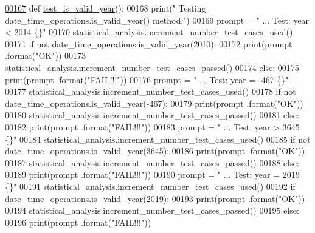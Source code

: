 \begin{DoxyCode}
\hypertarget{classutilities_1_1date__time__processing__tester_1_1date__time__operations__tester_l00167}{}\hyperlink{classutilities_1_1date__time__processing__tester_1_1date__time__operations__tester_ae745c61827bc1d30d5c964b4d9586343}{00167}     \textcolor{keyword}{def }\hyperlink{classutilities_1_1date__time__processing__tester_1_1date__time__operations__tester_ae745c61827bc1d30d5c964b4d9586343}{test\_is\_valid\_year}():
00168         print(\textcolor{stringliteral}{" Testing date\_time\_operations.is\_valid\_year() method."})
00169         prompt = \textcolor{stringliteral}{"  ... Test: year < 2014                   \{\}"}
00170         statistical\_analysis.increment\_number\_test\_cases\_used()
00171         \textcolor{keywordflow}{if} \textcolor{keywordflow}{not} date\_time\_operations.is\_valid\_year(2010):
00172             print(prompt .format(\textcolor{stringliteral}{"OK"}))
00173             statistical\_analysis.increment\_number\_test\_cases\_passed()
00174         \textcolor{keywordflow}{else}:
00175             print(prompt .format(\textcolor{stringliteral}{"FAIL!!!"}))
00176         prompt = \textcolor{stringliteral}{"  ... Test: year = -467                   \{\}"}
00177         statistical\_analysis.increment\_number\_test\_cases\_used()
00178         \textcolor{keywordflow}{if} \textcolor{keywordflow}{not} date\_time\_operations.is\_valid\_year(-467):
00179             print(prompt .format(\textcolor{stringliteral}{"OK"}))
00180             statistical\_analysis.increment\_number\_test\_cases\_passed()
00181         \textcolor{keywordflow}{else}:
00182             print(prompt .format(\textcolor{stringliteral}{"FAIL!!!"}))
00183         prompt = \textcolor{stringliteral}{"  ... Test: year > 3645                   \{\}"}
00184         statistical\_analysis.increment\_number\_test\_cases\_used()
00185         \textcolor{keywordflow}{if} \textcolor{keywordflow}{not} date\_time\_operations.is\_valid\_year(3645):
00186             print(prompt .format(\textcolor{stringliteral}{"OK"}))
00187             statistical\_analysis.increment\_number\_test\_cases\_passed()
00188         \textcolor{keywordflow}{else}:
00189             print(prompt .format(\textcolor{stringliteral}{"FAIL!!!"}))
00190         prompt = \textcolor{stringliteral}{"  ... Test: year = 2019                   \{\}"}
00191         statistical\_analysis.increment\_number\_test\_cases\_used()
00192         \textcolor{keywordflow}{if} date\_time\_operations.is\_valid\_year(2019):
00193             print(prompt .format(\textcolor{stringliteral}{"OK"}))
00194             statistical\_analysis.increment\_number\_test\_cases\_passed()
00195         \textcolor{keywordflow}{else}:
00196             print(prompt .format(\textcolor{stringliteral}{"FAIL!!!"}))
\end{DoxyCode}
